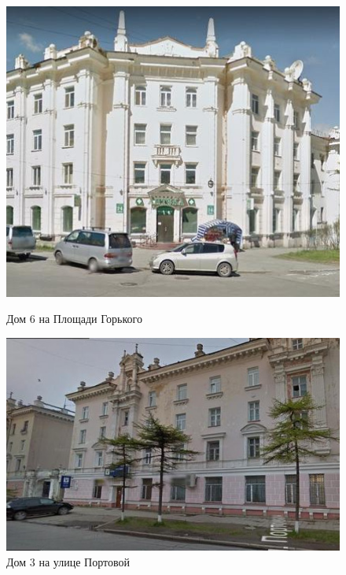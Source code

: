 \begin{figure}[H]
  \begin{center}
    \begin{minipage}[h]{0.38\linewidth}
        \includegraphics[width=1\textwidth]{authors/sydchak-fig-1.jpg}
        \caption{Дом 6 на Площади Горького}
        \label{fig:sydchak-fig-1}
    \end{minipage}
\hfill
    \begin{minipage}[h]{0.50\linewidth}
        \includegraphics[width=1\textwidth]{authors/sydchak-fig-2.jpg}
        \caption{Дом 3 на улице Портовой}
        \label{fig:sydchak-fig-2}
    \end{minipage}


  \end{center}

\end{figure}
